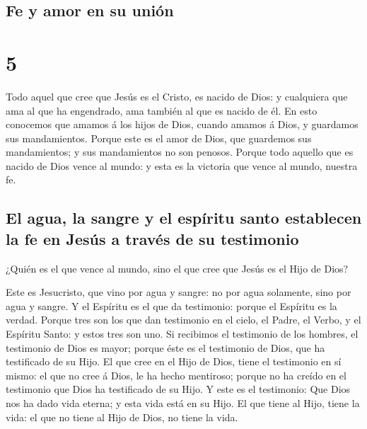 \hypertarget{fe-y-amor-en-su-uniuxf3n}{%
\subsection{Fe y amor en su unión}\label{fe-y-amor-en-su-uniuxf3n}}

\hypertarget{section-4}{%
\section{5}\label{section-4}}

 Todo aquel que cree que Jesús es el Cristo, es nacido de
Dios: y cualquiera que ama al que ha engendrado, ama también al que es
nacido de él.  En esto conocemos que amamos á los hijos de
Dios, cuando amamos á Dios, y guardamos sus mandamientos. 
Porque este es el amor de Dios, que guardemos sus mandamientos; y sus
mandamientos no son penosos.  Porque todo aquello que es
nacido de Dios vence al mundo: y esta es la victoria que vence al mundo,
nuestra fe.

\hypertarget{el-agua-la-sangre-y-el-espuxedritu-santo-establecen-la-fe-en-jesuxfas-a-travuxe9s-de-su-testimonio}{%
\subsection{El agua, la sangre y el espíritu santo establecen la fe en
Jesús a través de su
testimonio}\label{el-agua-la-sangre-y-el-espuxedritu-santo-establecen-la-fe-en-jesuxfas-a-travuxe9s-de-su-testimonio}}

 ¿Quién es el que vence al mundo, sino el que cree que Jesús
es el Hijo de Dios?

 Este es Jesucristo, que vino por agua y sangre: no por agua
solamente, sino por agua y sangre. Y el Espíritu es el que da
testimonio: porque el Espíritu es la verdad.  Porque tres
son los que dan testimonio en el cielo,  el Padre, el Verbo,
y el Espíritu Santo: y estos tres son uno.  Si recibimos el
testimonio de los hombres, el testimonio de Dios es mayor; porque éste
es el testimonio de Dios, que ha testificado de su Hijo. 
El que cree en el Hijo de Dios, tiene el testimonio en sí mismo: el que
no cree á Dios, le ha hecho mentiroso; porque no ha creído en el
testimonio que Dios ha testificado de su Hijo.  Y este es
el testimonio: Que Dios nos ha dado vida eterna; y esta vida está en su
Hijo.  El que tiene al Hijo, tiene la vida: el que no tiene
al Hijo de Dios, no tiene la vida.

